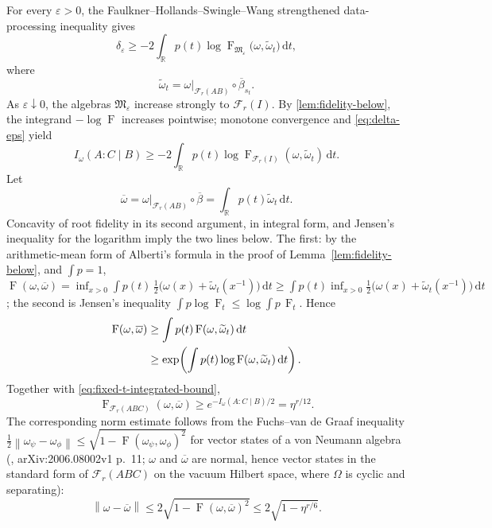 \documentclass[11pt]{article}
\theoremstyle{accent}
\theoremstyle{definition}
\newcommand{\cF}{\mathcal{F}}
\newcommand{\cM}{\mathfrak{M}}
\newcommand{\dd}{\,\mathrm{d}}
\newcommand{\eps}{\varepsilon}
\newcommand{\Fid}{\operatorname{F}}
\newcommand{\CMI}{I}
\newcommand{\norm}[1]{\left\lVert #1\right\rVert}
\begin{document}
For every \(\eps>0\), the Faulkner--Hollands--Swingle--Wang strengthened data-processing inequality gives
\begin{equation}\label{eq:FHWS-collar}
 \delta_\eps
 \ge-2\int_{\mathbb R}p(t)
 \log\Fid_{\cM_\eps}
 \bigl(\omega,\widetilde\omega_t\bigr)\dd t,
\end{equation}
where
\[
 \widetilde\omega_t
 =\omega|_{\cF_r(AB)}\circ\overline\beta_{s_t}.
\]
As \(\eps\downarrow0\), the algebras \(\cM_\eps\) increase strongly to \(\cF_r(I)\).  By \cref{lem:fidelity-below}, the integrand \(-\log\Fid\) increases pointwise; monotone convergence and \eqref{eq:delta-eps} yield
\begin{equation}\label{eq:fixed-t-integrated-bound}
 \CMI_\omega(A:C\mid B)
 \ge-2\int_{\mathbb R}p(t)
 \log\Fid_{\cF_r(I)}(\omega,\widetilde\omega_t)\dd t.
\end{equation}
Let
\[
 \overline\omega
 =\omega|_{\cF_r(AB)}\circ\overline\beta
 =\int_{\mathbb R}p(t)\widetilde\omega_t\dd t.
\]
Concavity of root fidelity in its second argument, in integral form, and Jensen's inequality for the logarithm imply the two lines below.  The first: by the arithmetic-mean form of Alberti's formula in the proof of Lemma~\ref{lem:fidelity-below}, and \(\int p=1\), \(\Fid(\omega,\overline\omega)=\inf_{x>0}\int p(t)\,\tfrac12\bigl(\omega(x)+\widetilde\omega_t(x^{-1})\bigr)\dd t\ge\int p(t)\inf_{x>0}\tfrac12\bigl(\omega(x)+\widetilde\omega_t(x^{-1})\bigr)\dd t\); the second is Jensen's inequality \(\int p\log\Fid_t\le\log\int p\,\Fid_t\).  Hence
\begin{align}
 \Fid(\omega,\overline\omega)
 &\ge\int p(t)\Fid(\omega,\widetilde\omega_t)\dd t\notag\\
 &\ge\exp\!\left(\int p(t)
 \log\Fid(\omega,\widetilde\omega_t)\dd t\right).
\end{align}
Together with \eqref{eq:fixed-t-integrated-bound},
\begin{equation}\label{eq:zero-collar-fidelity}
 \boxed{
 \Fid_{\cF_r(ABC)}(\omega,\overline\omega)
 \ge e^{-\CMI_\omega(A:C\mid B)/2}
 =\eta^{r/12}.
 }
\end{equation}
The corresponding norm estimate follows from the Fuchs--van de Graaf inequality \(\tfrac12\norm{\omega_\psi-\omega_\phi}\le\sqrt{1-\Fid(\omega_\psi,\omega_\phi)^2}\) for vector states of a von Neumann algebra (\cite[Lemma~3(3), eq.~(58)]{FHWS}, arXiv:2006.08002v1 p.~11; \(\omega\) and \(\overline\omega\) are normal, hence vector states in the standard form of \(\cF_r(ABC)\) on the vacuum Hilbert space, where \(\Omega\) is cyclic and separating):
\begin{equation}\label{eq:zero-collar-norm}
 \norm{\omega-\overline\omega}
 \le2\sqrt{1-\Fid(\omega,\overline\omega)^2}
 \le2\sqrt{1-\eta^{r/6}}.
\end{equation}
\end{document}
